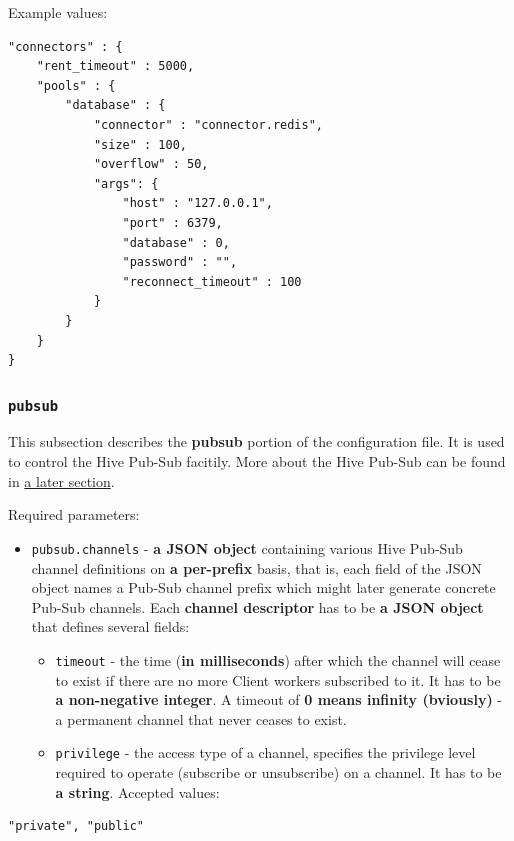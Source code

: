 \documentclass[a4paper]{article}
\begin{document}
\noindent
Example values:


\begin{verbatim}
"connectors" : {
    "rent_timeout" : 5000,
    "pools" : {
        "database" : {
            "connector" : "connector.redis",
            "size" : 100,
            "overflow" : 50,
            "args": {
                "host" : "127.0.0.1",
                "port" : 6379,
                "database" : 0,
                "password" : "",
                "reconnect_timeout" : 100
            }
        }
    }
}
\end{verbatim}
\subsubsection{\texttt{pubsub}}
\label{sec-3-1-5}

This subsection describes the \textbf{pubsub} portion of the configuration file. It is used to control the Hive Pub-Sub facitily. More about the Hive Pub-Sub can be found in \hyperref[sec-7-3]{a later section}.

\noindent
Required parameters:

\label{ref-pubsub_config}

\begin{itemize}
\item \texttt{pubsub.channels} - \textbf{a JSON object} containing various Hive Pub-Sub channel definitions on \textbf{a per-prefix} basis, that is, each field of the JSON object names a Pub-Sub channel prefix which might later generate concrete Pub-Sub channels. Each \textbf{channel descriptor} has to be \textbf{a JSON object} that defines several fields:
\begin{itemize}
\item \texttt{timeout} - the time (\textbf{in milliseconds}) after which the channel will cease to exist if there are no more Client workers subscribed to it. It has to be \textbf{a non-negative integer}. A timeout of \textbf{0 means infinity (bviously)} - a permanent channel that never ceases to exist.
\item \texttt{privilege} - the access type of a channel, specifies the privilege level required to operate (subscribe or unsubscribe) on a channel. It has to be \textbf{a string}. Accepted values:
\end{itemize}
\end{itemize}


\begin{verbatim}
"private", "public"
\end{verbatim}
\end{document}
